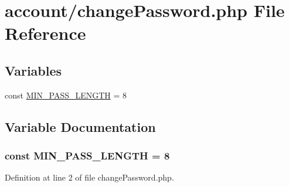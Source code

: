 \hypertarget{change_password_8php}{}\section{account/change\+Password.php File Reference}
\label{change_password_8php}
\subsection*{Variables}
\begin{DoxyCompactItemize}
\item 
const \hyperlink{change_password_8php_a6c3df7b105f3bc79a77ad108e256262e}{M\+I\+N\+\_\+\+P\+A\+S\+S\+\_\+\+L\+E\+N\+G\+TH} = 8
\end{DoxyCompactItemize}


\subsection{Variable Documentation}
\subsubsection[{\texorpdfstring{M\+I\+N\+\_\+\+P\+A\+S\+S\+\_\+\+L\+E\+N\+G\+TH}{MIN_PASS_LENGTH}}]{\setlength{\rightskip}{0pt plus 5cm}const M\+I\+N\+\_\+\+P\+A\+S\+S\+\_\+\+L\+E\+N\+G\+TH = 8}\hypertarget{change_password_8php_a6c3df7b105f3bc79a77ad108e256262e}{}\label{change_password_8php_a6c3df7b105f3bc79a77ad108e256262e}


Definition at line 2 of file change\+Password.\+php.

